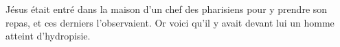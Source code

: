 \encetemps Jésus était entré dans la maison d’un chef des pharisiens
		pour y prendre son repas,
	et ces derniers l’observaient.
Or voici qu’il y avait devant lui un homme atteint d’hydropisie.
